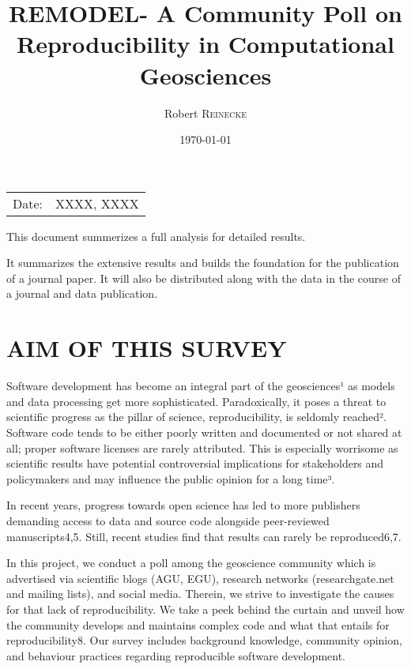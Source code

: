 \documentclass{article}
\title{REMODEL- A Community Poll on Reproducibility in Computational Geosciences} %
\author{Robert \textsc{Reinecke}} %
\date{\today} %
\begin{document}
\maketitle %

\begin{center}
\begin{tabular}{l r}
Date: & XXXX, XXXX \\ %
\end{tabular}
\end{center}

This document summerizes a full analysis for detailed results.

It summarizes the extensive results and builds the foundation for the publication of a journal paper.
It will also be distributed along with the data in the course of a journal and data publication.

\section{AIM OF THIS SURVEY}

Software development has become an integral part of the geosciences¹ as models and data processing get more sophisticated. Paradoxically, it poses a threat to scientific progress as the pillar of science, reproducibility, is seldomly reached². Software code tends to be either poorly written and documented or not shared at all; proper software licenses are rarely attributed. This is especially worrisome as scientific results have potential controversial implications for stakeholders and policymakers and may influence the public opinion for a long time³.

In recent years, progress towards open science has led to more publishers demanding access to data and source code alongside peer-reviewed manuscripts4,5. Still, recent studies find that results can rarely be reproduced6,7.

In this project, we conduct a poll among the geoscience community which is advertised via scientific blogs (AGU, EGU), research networks (researchgate.net and mailing lists), and social media. Therein, we strive to investigate the causes for that lack of reproducibility. We take a peek behind the curtain and unveil how the community develops and maintains complex code and what that entails for reproducibility8. Our survey includes background knowledge, community opinion, and behaviour practices regarding reproducible software development.
\end{document}
